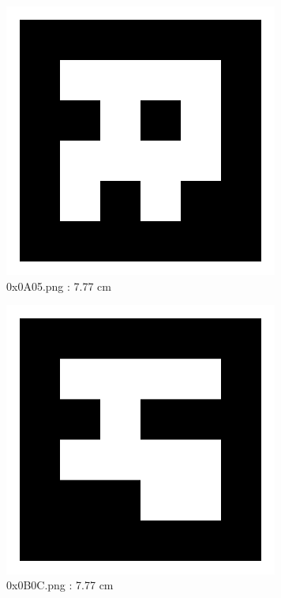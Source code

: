 \documentclass[11pt,a4,BCOR=0cm]{scrartcl}
\begin{document}
\begin{figure}
  \centering
    \includegraphics[natwidth=400,natheight=400,width=9cm]{0x0A05.png}
    \caption{0x0A05.png : 7.77 cm}
    \label{fig:0x0A05.png}
  
\end{figure} 

\begin{figure}
  \centering
    \includegraphics[natwidth=400,natheight=400,width=9cm]{0x0B0C.png}
    \caption{0x0B0C.png : 7.77 cm}
    \label{fig:0x0B0C.png}
  
\end{figure} 

\clearpage
\end{document}
